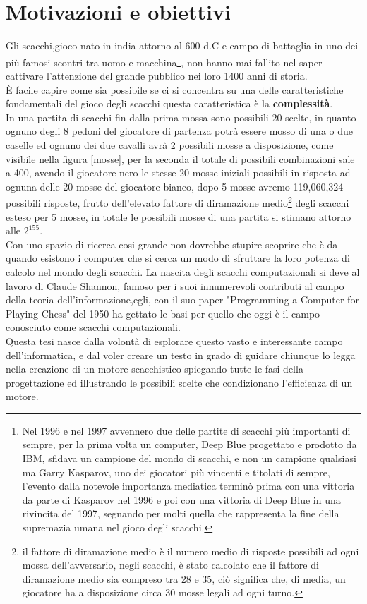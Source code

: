 \section{Motivazioni e obiettivi}
Gli scacchi,gioco nato in india attorno al 600 d.C e campo di battaglia in uno dei più famosi scontri tra uomo e macchina\footnote{Nel 1996 e nel 1997 avvennero due delle partite di scacchi più importanti di sempre,
 per la prima volta un computer, Deep Blue progettato e prodotto da IBM, sfidava un campione del mondo di scacchi, e non un campione qualsiasi ma Garry Kasparov, uno dei giocatori più vincenti e titolati di sempre, 
 l'evento dalla notevole importanza mediatica terminò prima con una vittoria da parte di Kasparov nel 1996 e poi con una vittoria di Deep Blue in una rivincita del 1997, segnando per molti quella che rappresenta la
  fine della supremazia umana nel gioco degli scacchi. }, non hanno mai fallito nel saper cattivare  l'attenzione del grande pubblico nei loro 1400 anni di storia.
 \\È facile capire come sia possibile se ci si concentra su una delle caratteristiche fondamentali del 
 gioco degli scacchi  questa caratteristica è la \textbf{complessità}.\\In una partita di scacchi fin dalla prima mossa 
sono possibili 20 scelte, in quanto ognuno degli 8 pedoni del giocatore di partenza potrà essere mosso di una o due caselle ed ognuno dei due cavalli avrà 2 possibili mosse a disposizione, come visibile nella figura \ref{mosse}, per la seconda il totale di possibili combinazioni sale a 400, avendo il giocatore nero le stesse 20 mosse iniziali possibili in risposta ad ognuna delle 20 mosse del giocatore bianco,
 dopo 5 mosse avremo 119,060,324 possibili risposte, frutto dell'elevato fattore di diramazione medio\footnote{ il fattore di diramazione medio è il numero medio di risposte possibili ad ogni mossa dell'avversario, negli scacchi, è stato calcolato che il fattore di diramazione medio sia compreso tra 28 e 35, ciò significa che, di media, un giocatore ha a disposizione circa 30 mosse legali ad ogni turno.} degli scacchi esteso per 5 mosse, in totale le possibili mosse di una partita si stimano attorno alle \(2^{155} \).
 \\Con uno spazio di ricerca cosi grande non dovrebbe stupire scoprire che è da quando esistono i computer che si cerca un modo
 di sfruttare la loro potenza di calcolo nel mondo degli scacchi.
 La nascita degli scacchi computazionali si deve al lavoro di Claude Shannon, famoso per i suoi innumerevoli contributi al 
 campo della teoria dell'informazione,egli, con il suo paper "Programming a Computer for Playing Chess"\cite{shannon} del 1950 ha gettato le
 basi per quello che oggi è il campo conosciuto come scacchi computazionali.
 \\Questa tesi nasce dalla volontà di esplorare questo vasto e interessante campo dell'informatica, e dal voler creare un testo
 in grado di guidare chiunque lo legga nella creazione di un motore scacchistico spiegando tutte le fasi della progettazione
 ed illustrando le possibili scelte che condizionano l'efficienza di un motore.


